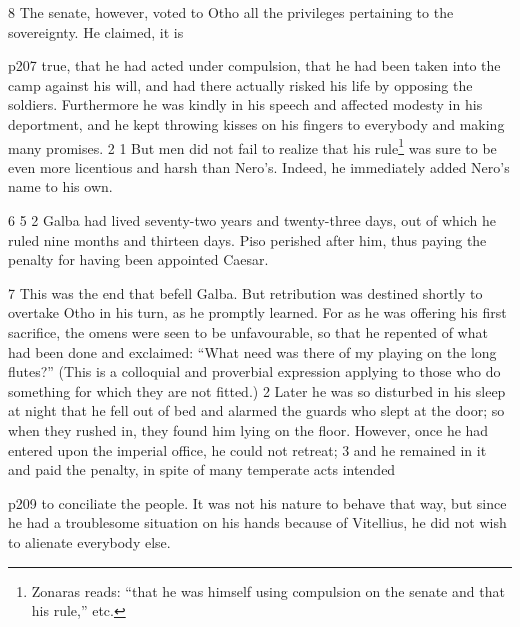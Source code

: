 8 The senate, however, voted to Otho all the privileges pertaining to the sovereignty. He claimed, it is

p207 true, that he had acted under compulsion, that he had been taken into the camp against his will, and had there actually risked his life by opposing the soldiers. Furthermore he was kindly in his speech and affected modesty in his deportment, and he kept throwing kisses on his fingers to everybody and making many promises. 2 1 But men did not fail to realize that his rule\texthebrew{⁠}\footnote{Zonaras reads: ``that he was himself using compulsion on the senate and that his rule,'' etc.

} was sure to be even more licentious and harsh than Nero's. Indeed, he immediately added Nero's name to his own.

6 5 2 Galba had lived seventy-two years and twenty-three days, out of which he ruled nine months and thirteen days. Piso perished after him, thus paying the penalty for having been appointed Caesar.

7 This was the end that befell Galba. But retribution was destined shortly to overtake Otho in his turn, as he promptly learned. For as he was offering his first sacrifice, the omens were seen to be unfavourable, so that he repented of what had been done and exclaimed: ``What need was there of my playing on the long flutes?'' (This is a colloquial and proverbial expression applying to those who do something for which they are not fitted.) 2 Later he was so disturbed in his sleep at night that he fell out of bed and alarmed the guards who slept at the door; so when they rushed in, they found him lying on the floor. However, once he had entered upon the imperial office, he could not retreat; 3 and he remained in it and paid the penalty, in spite of many temperate acts intended

p209 to conciliate the people. It was not his nature to behave that way, but since he had a troublesome situation on his hands because of Vitellius, he did not wish to alienate everybody else.

